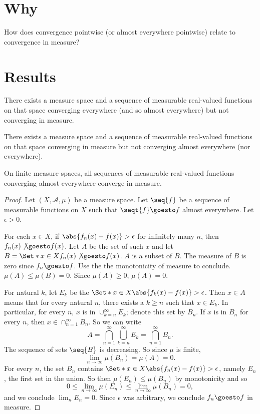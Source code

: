 

\section*{Why}

How does convergence pointwise (or almost everywhere pointwise) relate to convergence in measure?

\section*{Results}

\begin{proposition}
There exists
a measure space
and a sequence of
measurable
real-valued functions
on that space
converging everywhere
(and so almost everywhere)
but not converging
in measure.\end{proposition}
\begin{proposition}
There exists
a measure space
and a sequence of
measurable
real-valued functions
on that space
converging in measure
but not converging almost
everywhere (nor everywhere).\end{proposition}
\begin{proposition}
On finite measure spaces, all sequences of measurable real-valued functions converging almost everywhere converge in measure.\end{proposition}
\begin{proof}Let $(X, \mathcal{A} , \mu )$ be a measure space.
Let $\seq{f}$ be a sequence of measurable functions on $X$ such that $\seqt{f} \goesto f$ almost everywhere.
Let $\epsilon  > 0$.

For each $x \in X$, if $\abs{f_n(x) - f(x)} > \epsilon $ for infinitely many $n$, then $f_n(x) \not\goesto f(x)$.
Let $A$ be the set of such $x$ and let $B = \Set*{ x \in X }{ f_n(x) \not\goesto f(x) }$.
$A$ is a subset of $B$.
The measure of $B$ is zero since $f_n \goesto f$.
Use the the monotonicity of measure to conclude.
$\mu (A) \leq \mu (B) = 0$.
Since $\mu (A) \geq 0$,
$\mu (A) = 0$.

For natural $k$, let $E_k$ be the $\Set*{x \in X} {\abs{f_k(x) - f(x)} > \epsilon }$.
Then $x \in A$ means that for every natural $n$, there exists a $k \geq n$ such that $x \in E_k$.
In particular, for every $n$, $x$ is in $\cup_{k = n}^{\infty}E_k$;
denote this set by $B_n$.
If $x$ is in $B_n$ for every
$n$, then
$x \in \cap _{n = 1}^{\infty} B_n$.
So we can write
    \[
A = \bigcap_{n = 1}^{\infty}
\bigcup_{k = n}^{\infty}
E_k
= \bigcap_{n = 1}^{\infty}
B_n
.
    \]
The sequence of sets $\seq{B}$ is decreasing. So since $\mu $ is finite,
    \[
\lim_{n \to \infty} \mu (B_n) = \mu (A) = 0.
    \]
For every $n$, the set $B_n$ contains $\Set*{x \in X}{\abs{f_n(x) - f(x)} > \epsilon }$, namely $E_n$, the first set in the union.
So then $\mu (E_n) \leq \mu (B_n)$ by monotonicity and so
    \[
0
\leq \lim_{n \to \infty} \mu (E_n)
\leq \lim_{n \to \infty} \mu (B_n)
= 0,
    \]
and we conclude $\lim_{n} E_n = 0$.
Since $\epsilon $ was arbitrary,
we conclude $f_n \goesto f$ in
measure.
\end{proof}
